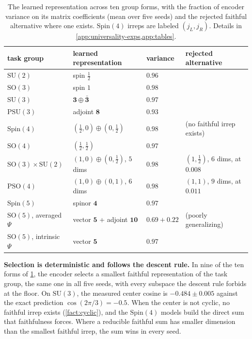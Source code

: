 \documentclass{article}
\newcommand{\SU}{\mathrm{SU}}
\newcommand{\SO}{\mathrm{SO}}
\newcommand{\PSU}{\mathrm{PSU}}
\newcommand{\Spin}{\mathrm{Spin}}
\newcommand{\PSO}{\mathrm{PSO}}
\begin{document}
\begin{table}[t]
\centering
\caption{The learned representation across ten group forms, with the
fraction of encoder variance on its matrix coefficients (mean over five
seeds) and the rejected faithful alternative where one exists.
$\Spin(4)$ irreps are labeled $(j_L, j_R)$. Details in
\cref{app:universality-exps,app:tables}.}
\label{tab:carriers}
\scriptsize
\setlength{\tabcolsep}{4pt}
\renewcommand{\arraystretch}{0.92}
\begin{tabular}{llll}
\toprule
task group & learned representation & variance & rejected alternative \\
\midrule
$\SU(2)$ & spin $\tfrac12$ & $0.96$ & \\
$\SO(3)$ & spin $1$ & $0.98$ & \\
$\SU(3)$ & $\mathbf{3} \oplus \bar{\mathbf{3}}$ & $0.97$ & \\
$\PSU(3)$ & adjoint $\mathbf{8}$ & $0.93$ & \\
$\Spin(4)$ & $(\tfrac12,0) \oplus (0,\tfrac12)$ & $0.98$ & (no faithful irrep exists) \\
$\SO(4)$ & $(\tfrac12,\tfrac12)$ & $0.97$ & \\
$\SO(3){\times}\SU(2)$ & $(1,0) \oplus (0,\tfrac12)$, $5$ dims & $0.98$ & $(1,\tfrac12)$, $6$ dims, at $0.008$ \\
$\PSO(4)$ & $(1,0) \oplus (0,1)$, $6$ dims & $0.98$ & $(1,1)$, $9$ dims, at $0.011$ \\
$\Spin(5)$ & spinor $\mathbf{4}$ & $0.97$ & \\
$\SO(5)$, averaged $\Psi$ & vector $\mathbf{5}$ + adjoint $\mathbf{10}$ & $0.69 + 0.22$ & (poorly generalizing) \\
$\SO(5)$, intrinsic $\Psi$ & vector $\mathbf{5}$ & $0.97$ & \\
\bottomrule
\end{tabular}
\end{table}

\textbf{Selection is deterministic and follows the descent rule.} In
nine of the ten forms of \cref{tab:carriers}, the encoder selects a
smallest faithful representation of the task group, the same one in all
five seeds, with every subspace the descent rule forbids at the floor.
On $\SU(3)$, the measured center cosine is $-0.484 \pm 0.005$ against
the exact prediction $\cos(2\pi/3) = -0.5$. When the center is not
cyclic, no faithful irrep exists (\cref{fact:cyclic}), and the
$\Spin(4)$ models build the direct sum that faithfulness forces. Where a reducible faithful sum has smaller dimension than the smallest
faithful irrep, the sum wins in every seed.
\end{document}
